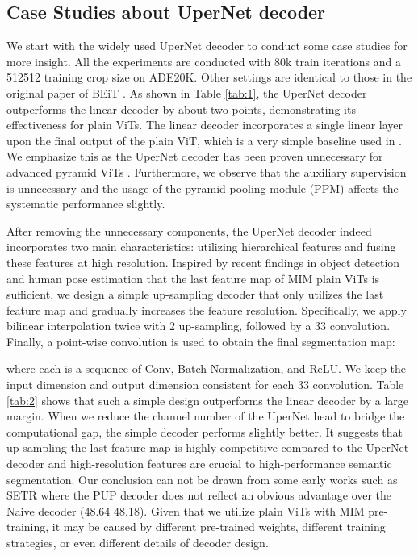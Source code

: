 \documentclass{article} \usepackage{iclr2024_conference,times}
\begin{document}
\subsection{Case Studies about UperNet decoder}

We start with the widely used UperNet decoder to conduct some case studies for more insight. All the experiments are conducted with 80k train iterations and a 512512 training crop size on ADE20K. Other settings are identical to those in the original paper of BEiT \citep{bao2022beit}. As shown in Table \ref{tab:1}, the UperNet decoder outperforms the linear decoder by about two points, demonstrating its effectiveness for plain ViTs. The linear decoder incorporates a single linear layer upon the final output of the plain ViT, which is a very simple baseline used in \citep{strudel2021segmenter}. We emphasize this as the UperNet decoder has been proven unnecessary for advanced pyramid ViTs \citep{xie2021segformer,gu2022multi}. Furthermore, we observe that the auxiliary supervision is unnecessary and the usage of the pyramid pooling module (PPM) affects the systematic performance slightly.

After removing the unnecessary components, the UperNet decoder indeed incorporates two main characteristics: utilizing hierarchical features and fusing these features at high resolution. Inspired by recent findings in object detection and human pose estimation that the last feature map of MIM plain ViTs is sufficient\citep{li2022exploring,xu2022vitpose}, we design a simple up-sampling decoder that only utilizes the last feature map and gradually increases the feature resolution. Specifically, we apply bilinear interpolation twice with 2 up-sampling, followed by a 33 convolution. Finally, a point-wise convolution is used to obtain the final segmentation map:

where each  is a sequence of Conv, Batch Normalization, and ReLU. We keep the input dimension and output dimension consistent for each 33 convolution. Table \ref{tab:2} shows that such a simple design outperforms the linear decoder by a large margin. When we reduce the channel number of the UperNet head to bridge the computational gap, the simple decoder performs slightly better. It suggests that up-sampling the last feature map is highly competitive compared to the UperNet decoder and high-resolution features are crucial to high-performance semantic segmentation. Our conclusion can not be drawn from some early works such as SETR where the PUP decoder does not reflect an obvious advantage over the Naive decoder (48.64  48.18). Given that we utilize plain ViTs with MIM pre-training, it may be caused by different pre-trained weights, different training strategies, or even different details of decoder design.
\end{document}
